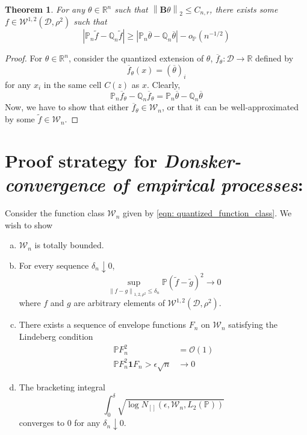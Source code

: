\documentclass{article}
\newcommand{\Reals}{\mathbb{R}}
\newcommand{\norm}[1]{\left\lVert#1\right\rVert}
\newcommand{\abs}[1]{\left \lvert #1 \right \rvert}
\newcommand{\Bbf}{\mathbf{B}}
\newcommand{\Dset}{\mathcal{D}}
\newcommand{\Wset}{\mathcal{W}}
\newcommand{\Pbb}{\mathbb{P}}
\newcommand{\Qbb}{\mathbb{Q}}
\newcommand{\1}{\mathbf{1}}
\theoremstyle{alden}
\theoremstyle{aldenthm}
\newtheorem{theorem}{Theorem}
\theoremstyle{remark}
\begin{document}
\begin{theorem}
	For any $\theta \in \Reals^n$ such that $\norm{\Bbf \theta}_2 \leq C_{n,r}$, there exists some $f \in \Wset^{1,2}(\Dset,\rho^2)$ such that 
	\begin{equation*}
	\abs{\Pbb_n \widetilde{f} - \Qbb_n \widetilde{f} } \geq \abs{\Pbb_n \overline{\theta} - \Qbb_n \overline{\theta} } - o_{\Pbb}(n^{-1/2})
	\end{equation*}
\end{theorem}
\begin{proof}
	For $\theta \in \Reals^n$, consider the quantized extension of $\theta$, $\overline{f}_{\theta}: \Dset \to \Reals$ defined by
	\begin{equation*}
	\overline{f}_{\theta}(x) = (\overline{\theta})_i
	\end{equation*}
	for any $x_i$ in the same cell $C(z)$ as $x$. Clearly,
	\begin{equation*}
	\Pbb_n \overline{f}_{\theta} - \Qbb_n \overline{f}_{\theta} = \Pbb_n \overline{\theta} - \Qbb_n \overline{\theta} 
	\end{equation*}
	Now, we have to show that either $\overline{f}_{\theta} \in \Wset_n$, or that it can be well-approximated by some $\widetilde{f} \in \Wset_n$. 
\end{proof}

\section{Proof strategy for \emph{Donsker-convergence of empirical processes}:}

Consider the function class $\Wset_n$ given by \eqref{eqn: quantized_function_class}. We wish to show

\begin{enumerate}[(a)]
	\item 
	$\Wset_n$ is totally bounded.
	\item
	For every sequence $\delta_n \downarrow 0$,
	\begin{equation*}
	\sup_{\norm{f - g}_{1,2,\rho^2} \leq \delta_n} \Pbb(\widetilde{f} - \widetilde{g})^2 \to 0
	\end{equation*}
	where $f$ and $g$ are arbitrary elements of $\Wset^{1,2}(\Dset,\rho^2)$.
	\item
	There exists a sequence of envelope functions $F_n$ on $\Wset_n$ satisfying the Lindeberg condition
	\begin{align*}
	\Pbb F_n^2 & = \mathcal{O}(1) \\
	\Pbb F_n^2 \1{F_n > \epsilon \sqrt{n}} & \to 0 \tag{for any $\epsilon > 0$}
	\end{align*}
	\item The bracketing integral
	\begin{equation*}
	\int_{0}^{\delta} \sqrt{\log N_{[]}(\epsilon, \Wset_n, L_2(\Pbb))}
	\end{equation*}
	converges to $0$ for any $\delta_n \downarrow 0$.
\end{enumerate}
\end{document}
